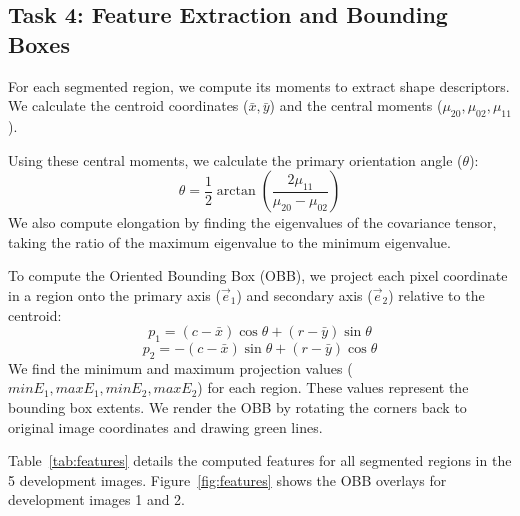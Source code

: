 \documentclass[11pt,letterpaper]{article}
\begin{document}
\subsection*{Task 4: Feature Extraction and Bounding Boxes}

For each segmented region, we compute its moments to extract shape descriptors. We calculate the centroid coordinates ($\bar{x}, \bar{y}$) and the central moments ($\mu_{20}, \mu_{02}, \mu_{11}$). 

Using these central moments, we calculate the primary orientation angle ($\theta$):
\[
\theta = \frac{1}{2} \arctan\left(\frac{2\mu_{11}}{\mu_{20} - \mu_{02}}\right)
\]
We also compute elongation by finding the eigenvalues of the covariance tensor, taking the ratio of the maximum eigenvalue to the minimum eigenvalue.

To compute the Oriented Bounding Box (OBB), we project each pixel coordinate in a region onto the primary axis ($\vec{e}_1$) and secondary axis ($\vec{e}_2$) relative to the centroid:
\[
p_1 = (c - \bar{x})\cos\theta + (r - \bar{y})\sin\theta
\]
\[
p_2 = -(c - \bar{x})\sin\theta + (r - \bar{y})\cos\theta
\]
We find the minimum and maximum projection values ($minE_1, maxE_1, minE_2, maxE_2$) for each region. These values represent the bounding box extents. We render the OBB by rotating the corners back to original image coordinates and drawing green lines.

Table~\ref{tab:features} details the computed features for all segmented regions in the 5 development images. Figure~\ref{fig:features} shows the OBB overlays for development images 1 and 2.
\end{document}

